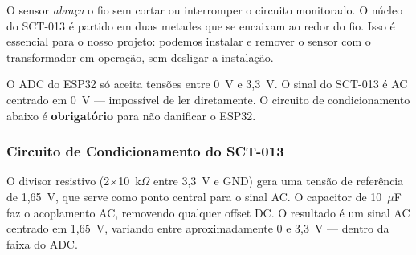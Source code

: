 \documentclass[12pt, a4paper]{article}
\begin{document}
\begin{tcolorbox}[caixaInfo, title={Por que ``não invasivo''?}]
O sensor \emph{abraça} o fio sem cortar ou interromper o circuito monitorado. O núcleo do SCT-013 é partido em duas metades que se encaixam ao redor do fio. Isso é essencial para o nosso projeto: podemos instalar e remover o sensor com o transformador em operação, sem desligar a instalação.
\end{tcolorbox}

\begin{tcolorbox}[caixaAlerta, title={Circuito de Condicionamento Obrigatório}]
O ADC do ESP32 só aceita tensões entre 0~V e 3,3~V. O sinal do SCT-013 é AC centrado em 0~V --- impossível de ler diretamente. O circuito de condicionamento abaixo é \textbf{obrigatório} para não danificar o ESP32.
\end{tcolorbox}

\subsubsection{Circuito de Condicionamento do SCT-013}

\begin{center}
\end{center}

O divisor resistivo (2$\times$10~k$\Omega$ entre 3,3~V e GND) gera uma tensão de referência de 1,65~V, que serve como ponto central para o sinal AC. O capacitor de 10~$\mu$F faz o acoplamento AC, removendo qualquer offset DC. O resultado é um sinal AC centrado em 1,65~V, variando entre aproximadamente 0 e 3,3~V --- dentro da faixa do ADC.
\end{document}
